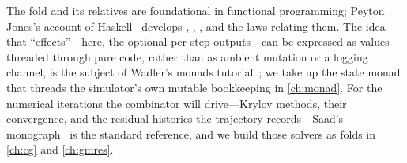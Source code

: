 \furtherreading
The fold and its relatives are foundational in functional programming; Peyton
Jones's account of Haskell~\citep{peytonjones2003} develops ,
, , and the laws relating them. The idea that
``effects''---here, the optional per-step outputs---can be expressed as values
threaded through pure code, rather than as ambient mutation or a logging channel,
is the subject of Wadler's monads tutorial~\citep{wadler1995monads}; we take up the
state monad that threads the simulator's own mutable bookkeeping in
\cref{ch:monad}. For the numerical iterations the combinator will drive---Krylov
methods, their convergence, and the residual histories the trajectory
records---Saad's monograph~\citep{saad2003} is the standard reference, and we build
those solvers as folds in \cref{ch:cg} and \cref{ch:gmres}.

